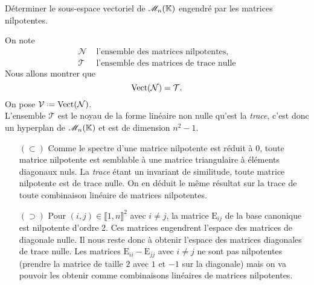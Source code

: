 \begin{exercice}
    Déterminer le sous-espace vectoriel de $\mathscr{M}_n(\mathbb{K})$ engendré par les matrices nilpotentes.
\end{exercice}

\begin{solution}
    On note 
    \begin{align*}
        \mathcal{N} & \text{ l'ensemble des matrices nilpotentes}, \\
        \mathcal{T} & \text{ l'ensemble des matrices de trace nulle}
    \end{align*}
    Nous allons montrer que 
    $$\mathrm{Vect}(\mathcal{N}) = \mathcal{T}.$$
    On pose $\mathcal{V} \defeq \Vect(\mathcal{N})$. \\
    L'ensemble $\mathcal{T}$ est le noyau de la forme linéaire non nulle qu'est la \emph{trace}, c'est donc un hyperplan de $\mathscr{M}_n(\mathbb{K})$ et est de dimension $n^2-1$.
    \begin{itemize}
        \item[$(\subset)$] Comme le spectre d'une matrice nilpotente est réduit à $0$, toute matrice nilpotente est semblable à une matrice triangulaire à éléments diagonaux nuls. La \emph{trace} étant un invariant de similitude, toute matrice nilpotente est de trace nulle. On en déduit le même résultat sur la trace de toute combinaison linéaire de matrices nilpotentes.
        \item[$(\supset)$] Pour $(i,j) \in \llbracket 1, n \rrbracket^2$ avec $i \not= j$, la matrice $\mathrm{E}_{ij}$ de la base canonique est nilpotente d'ordre $2$. Ces matrices engendrent l'espace des matrices de diagonale nulle. Il nous reste donc à obtenir l'espace des matrices diagonales de trace nulle. Les matrices $\mathrm{E}_{ii} - \mathrm{E}_{jj}$ avec $i \not= j$ ne sont pas nilpotentes (prendre la matrice de taille $2$ avec $1$ et $-1$ sur la diagonale) mais on va pouvoir les obtenir comme combinaisons linéaires de matrices nilpotentes. \\

\end{itemize}
\end{solution}
